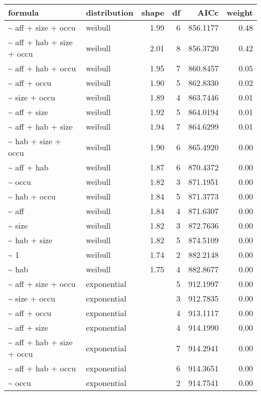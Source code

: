 \begin{table}[ht]
\centering
\begin{tabular}{llrrrr}
 formula & distribution & shape & df & AICc & weight \\ 
  \hline
\~{} aff + size + occu & weibull & 1.99 & 6 & 856.1177 & 0.48 \\ 
  \~{} aff + hab + size + occu & weibull & 2.01 & 8 & 856.3720 & 0.42 \\ 
  \~{} aff + hab + occu & weibull & 1.95 & 7 & 860.8457 & 0.05 \\ 
  \~{} aff + occu & weibull & 1.90 & 5 & 862.8330 & 0.02 \\ 
  \~{} size + occu & weibull & 1.89 & 4 & 863.7446 & 0.01 \\ 
  \~{} aff + size & weibull & 1.92 & 5 & 864.0194 & 0.01 \\ 
  \~{} aff + hab + size & weibull & 1.94 & 7 & 864.6299 & 0.01 \\ 
  \~{} hab + size + occu & weibull & 1.90 & 6 & 865.4920 & 0.00 \\ 
  \~{} aff + hab & weibull & 1.87 & 6 & 870.4372 & 0.00 \\ 
  \~{} occu & weibull & 1.82 & 3 & 871.1951 & 0.00 \\ 
  \~{} hab + occu & weibull & 1.84 & 5 & 871.3773 & 0.00 \\ 
  \~{} aff & weibull & 1.84 & 4 & 871.6307 & 0.00 \\ 
  \~{} size & weibull & 1.82 & 3 & 872.7636 & 0.00 \\ 
  \~{} hab + size & weibull & 1.82 & 5 & 874.5109 & 0.00 \\ 
  \~{} 1 & weibull & 1.74 & 2 & 882.2148 & 0.00 \\ 
  \~{} hab & weibull & 1.75 & 4 & 882.8677 & 0.00 \\ 
  \~{} aff + size + occu & exponential &  & 5 & 912.1997 & 0.00 \\ 
  \~{} size + occu & exponential &  & 3 & 912.7835 & 0.00 \\ 
  \~{} aff + occu & exponential &  & 4 & 913.1117 & 0.00 \\ 
  \~{} aff + size & exponential &  & 4 & 914.1990 & 0.00 \\ 
  \~{} aff + hab + size + occu & exponential &  & 7 & 914.2941 & 0.00 \\ 
  \~{} aff + hab + occu & exponential &  & 6 & 914.3651 & 0.00 \\ 
  \~{} occu & exponential &  & 2 & 914.7541 & 0.00 \\ 

\end{tabular}
\end{table}
